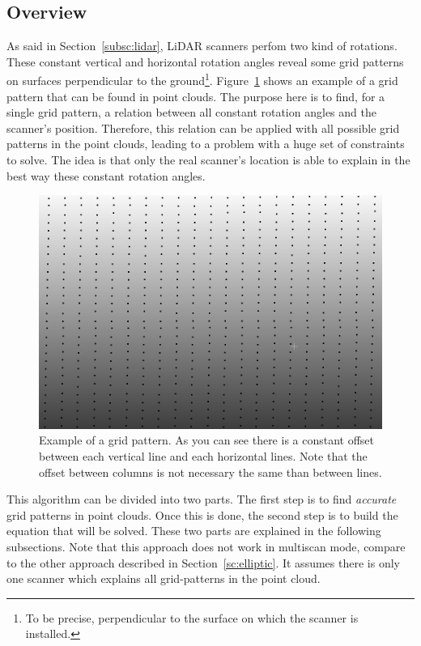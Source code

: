 \subsection{Overview}
As said in Section~\ref{subsc:lidar}, LiDAR scanners perfom two kind of rotations. These constant vertical and horizontal rotation angles reveal some grid patterns on surfaces perpendicular to the ground\footnote{To be precise, perpendicular to the surface on which the scanner is installed.}. Figure~\ref{fig:grid1} shows an example of a grid pattern that can be found in point clouds. The purpose here is to find, for a single grid pattern, a relation between all constant rotation angles and the scanner's position. Therefore, this relation can be applied with all possible grid patterns in the point clouds, leading to a problem with a huge set of
constraints to solve. The idea is that only the real scanner's location is able to explain in the best way these constant rotation angles.

\begin{figure}[H]
  \centering
  \includegraphics[scale=0.5]{img/grid1.png}
  \caption{Example of a grid pattern. As you can see there is a constant offset between each vertical line and each horizontal lines. Note that the offset between columns is not necessary the same than between lines.}
  \label{fig:grid1}
\end{figure}

This algorithm can be divided into two parts. The first step is to find \emph{accurate} grid patterns in point clouds. Once this is done, the second step is to build the equation that will be solved. These two parts are explained in the following subsections. Note that this approach does not work in multiscan mode, compare to the other approach described in Section~\ref{sc:elliptic}. It assumes there is only one scanner which explains all grid-patterns in the point cloud.

